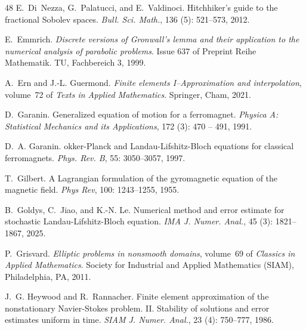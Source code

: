 \documentclass[11pt,reqno]{amsart}
\theoremstyle{definition}
\numberwithin{equation}{section}
\begin{document}
\begin{thebibliography}{48}
	E.~Di~Nezza, G.~Palatucci, and E.~Valdinoci.
	\newblock Hitchhiker's guide to the fractional {S}obolev spaces.
	\newblock \emph{Bull. Sci. Math.}, 136 (5): 521--573, 2012.
	
	E.~Emmrich.
	\newblock \emph{Discrete versions of Gronwall's lemma and their application to
		the numerical analysis of parabolic problems}.
	\newblock Issue 637 of Preprint Reihe Mathematik. TU, Fachbereich 3, 1999.
	
	A.~Ern and J.-L. Guermond.
	\newblock \emph{Finite elements {I}--{A}pproximation and interpolation},
	volume~72 of \emph{Texts in Applied Mathematics}.
	\newblock Springer, Cham, 2021.
	
	D.~Garanin.
	\newblock Generalized equation of motion for a ferromagnet.
	\newblock \emph{Physica A: Statistical Mechanics and its Applications},
	172 (3): 470 -- 491, 1991.
	
	D.~A. Garanin.
	okker-{P}lanck and {L}andau-{L}ifshitz-{B}loch equations for
	classical ferromagnets.
	\newblock \emph{Phys. Rev. B}, 55: 3050--3057, 1997.
	
	T.~Gilbert.
	\newblock A {L}agrangian formulation of the gyromagnetic equation of the
	magnetic field.
	\newblock \emph{Phys Rev}, 100: 1243--1255, 1955.
	
	B.~Goldys, C.~Jiao, and K.-N. Le.
	\newblock Numerical method and error estimate for stochastic
	{L}andau-{L}ifshitz-{B}loch equation.
	\newblock \emph{IMA J. Numer. Anal.}, 45 (3): 1821--1867,
	2025.
	
	P.~Grisvard.
	\newblock \emph{Elliptic problems in nonsmooth domains}, volume~69 of
	\emph{Classics in Applied Mathematics}.
	\newblock Society for Industrial and Applied Mathematics (SIAM), Philadelphia,
	PA, 2011.
	
	J.~G. Heywood and R.~Rannacher.
	\newblock Finite element approximation of the nonstationary {N}avier-{S}tokes
	problem. {II}. {S}tability of solutions and error estimates uniform in time.
	\newblock \emph{SIAM J. Numer. Anal.}, 23 (4): 750--777,
	1986.
	

\end{thebibliography}
\end{document}
